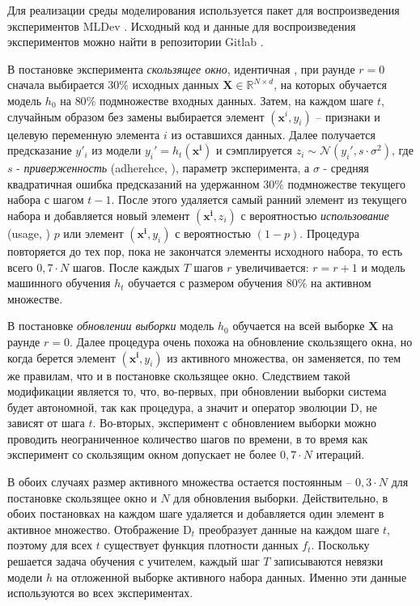     Для реализации среды моделирования используется пакет для воспроизведения экспериментов MLDev \citep{khritankov2021mldev}. Исходный код и данные для воспроизведения экспериментов можно найти в репозитории Gitlab \footnotemark.


    В постановке эксперимента \emph{скользящее окно}, идентичная \citep{khritankov2023positive}, при раунде $r = 0$ сначала выбирается $30\%$ исходных данных $\textbf{X} \in \mathbb{R}^{N \times d}$, на которых обучается модель $h_0$ на $80\%$ подмножестве входных данных.   
    Затем, на каждом шаге $t$, случайным образом без замены выбирается элемент $(\mathbf{x}^i, y_i)$ -- признаки и целевую переменную элемента $i$ из оставшихся данных. Далее получается предсказание $y'_i$ из модели $y_i' = h_t(\mathbf{x^i})$ и сэмплируется $z_i \sim \mathcal{N}(y_i', s \cdot \sigma^2)$, где $s$ - \emph{приверженность} (adherehce,  \citep{khritankov2023positive}), параметр эксперимента, а $\sigma$ - средняя квадратичная ошибка предсказаний на удержанном $30\%$ подмножестве текущего набора с шагом $t - 1$. После этого удаляется самый ранний элемент из текущего набора и добавляется новый элемент $(\mathbf{x^i}, z_i)$ с вероятностью \emph{использование} (usage,  \citep{khritankov2023positive}) $p$ или элемент $(\mathbf{x^i}, y_i)$ с вероятностью $(1-p)$. Процедура повторяется до тех пор, пока не закончатся элементы исходного набора, то есть всего $0,7 \cdot N$ шагов. После каждых $T$ шагов $r$ увеличивается: $r = r + 1$ и модель машинного обучения $h_t$ обучается с размером обучения $80\%$ на активном множестве.

    В постановке \emph{обновлении выборки} модель $h_0$ обучается на всей выборке $\textbf{X}$ на раунде $r = 0$. Далее процедура очень похожа на обновление скользящего окна, но когда берется элемент $(\mathbf{x^i}, y_i)$ из активного множества, он заменяется, по тем же правилам, что и в постановке скользящее окно. Следствием такой модификации является то, что, во-первых, при обновлении выборки система будет автономной, так как процедура, а значит и оператор эволюции $\text{D}$, не зависят от шага $t$. Во-вторых, эксперимент с обновлением выборки можно проводить неограниченное количество шагов по времени, в то время как эксперимент со скользящим окном допускает не более $0,7 \cdot N$ итераций. 

    В обоих случаях размер активного множества остается постоянным -- $0,3 \cdot N$ для постановке скользящее окно и $N$ для обновления выборки. Действительно, в обоих постановках на каждом шаге удаляется и добавляется один элемент в активное множество. Отображение $\text{D}_t$ преобразует данные на каждом шаге $t$, поэтому для всех $t$ существует функция плотности данных $f_t$. Поскольку решается задача обучения с учителем, каждый шаг $T$ записываются невязки модели $h$ на отложенной выборке активного набора данных. Именно эти данные используются во всех экспериментах.

